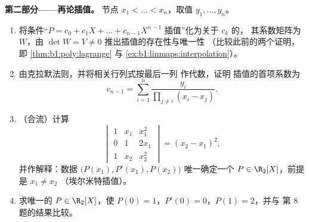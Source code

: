 \begin{problem}
\medskip
\noindent\textbf{第二部分——再论插值。} 节点
$x_1 < \dots < x_n$，取值 $y_1, \dots, y_n$。
\begin{enumerate}[resume]
  \item 将条件“$P = c_0 + c_1X + \dots +
        c_{n-1}X^{n-1}$ 插值”化为关于 $c_k$ 的，
        其系数矩阵为 $W$，由 $\det W = V \neq
        0$ 推出插值的存在性与唯一性
        （比较此前的两个证明，即
        \cref{thm:b1:poly:lagrange} 与
        \cref{ex:b1:linmaps:interpolation}）。
  \item 由克拉默法则，并将相关行列式按最后一列
        作代数，证明
        插值的首项系数为
        \[
        c_{n-1} = \sum_{i=1}^{n}
        \frac{y_i}{\prod_{j \neq i}(x_i - x_j)} .
        \]
  \item （合流）计算
        \[
        \begin{vmatrix}
        1 & x_1 & x_1^2\\
        0 & 1 & 2x_1\\
        1 & x_2 & x_2^2
        \end{vmatrix}
        = (x_2 - x_1)^2 ,
        \]
        并作解释：数据 $\bigl(P(x_1), P'(x_1),
        P(x_2)\bigr)$ 唯一确定一个 $P \in \R_2[X]$，前提是 $x_1 \neq x_2$
        （埃尔米特插值）。
  \item 求唯一的 $P \in \R_2[X]$，使 $P(0) = 1$，$P'(0)
        = 0$，$P(1) = 2$，并与
        第 8 题的结果比较。
\end{enumerate}


\end{problem}
